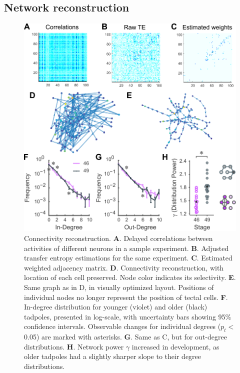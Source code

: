 \documentclass{article}
\begin{document}
\subsection*{Network reconstruction}

\begin{figure}[t!]
\includegraphics[width=\linewidth]{fig4.pdf}
\caption{
Connectivity reconstruction.  \textbf{A}. Delayed correlations between activities of different neurons in a sample experiment. \textbf{B}. Adjusted transfer entropy estimations for the same experiment. \textbf{C}. Estimated weighted adjacency matrix. \textbf{D}. Connectivity reconstruction, with location of each cell preserved. Node color indicates its selectivity. \textbf{E}. Same graph as in D, in visually optimized layout. Positions of individual nodes no longer represent the position of tectal cells. \textbf{F}. In-degree distribution for younger (violet) and older (black) tadpoles, presented in log-scale, with uncertainty bars showing 95\% confidence intervals. Observable changes for individual degrees ($p_t<$ 0.05) are marked with asterisks. \textbf{G}. Same as C, but for out-degree distributions. \textbf{H}. Network power $\gamma$ increased in development, as older tadpoles had a slightly sharper slope to their degree distributions. }
\end{figure}
\end{document}
